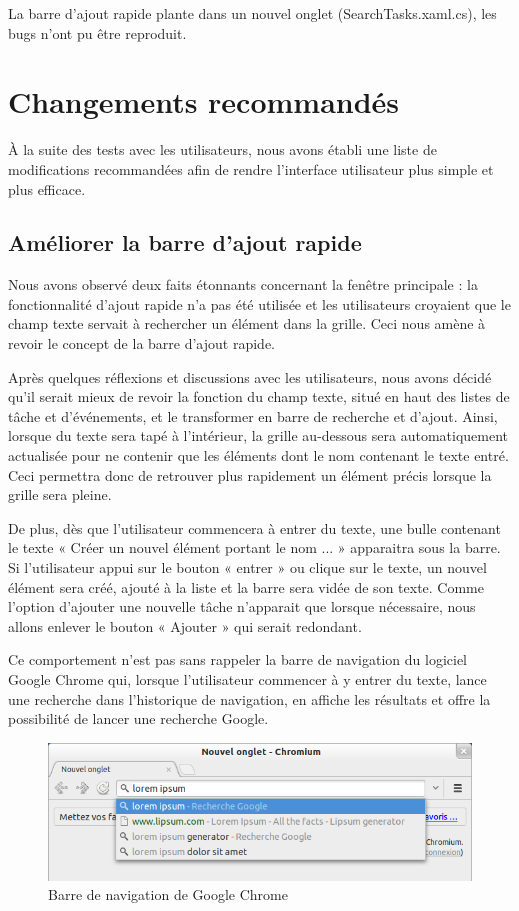 \documentclass[letterpaper, oneside, 12pt, these, creativecommons]{thETS}
\begin{document}
La barre d'ajout rapide plante dans un nouvel onglet (SearchTasks.xaml.cs), les bugs n'ont pu être reproduit.

\chapter{Changements recommandés}

À la suite des tests avec les utilisateurs, nous avons établi une liste de modifications recommandées afin de rendre l'interface utilisateur plus simple et plus efficace.

\section{Améliorer la barre d'ajout rapide}

Nous avons observé deux faits étonnants concernant la fenêtre principale : la fonctionnalité d'ajout rapide n'a pas été utilisée et les utilisateurs croyaient que le champ texte servait à rechercher un élément dans la grille. Ceci nous amène à revoir le concept de la barre d'ajout rapide.

Après quelques réflexions et discussions avec les utilisateurs, nous avons décidé qu'il serait mieux de revoir la fonction du champ texte, situé en haut des listes de tâche et d'événements, et le transformer en barre de recherche et d'ajout. Ainsi, lorsque du texte sera tapé à l'intérieur, la grille au-dessous sera automatiquement actualisée pour ne contenir que les éléments dont le nom contenant le texte entré. Ceci permettra donc de retrouver plus rapidement un élément précis lorsque la grille sera pleine.

De plus, dès que l'utilisateur commencera à entrer du texte, une bulle contenant le texte « Créer un nouvel élément portant le nom ... » apparaitra sous la barre. Si l'utilisateur appui sur le bouton « entrer » ou clique sur le texte, un nouvel élément sera créé, ajouté à la liste et la barre sera vidée de son texte. Comme l'option d'ajouter une nouvelle tâche n'apparait que lorsque nécessaire, nous allons enlever le bouton « Ajouter » qui serait redondant.

Ce comportement n'est pas sans rappeler la barre de navigation du logiciel Google Chrome qui, lorsque l'utilisateur commencer à y entrer du texte, lance une recherche dans l'historique de navigation, en affiche les résultats et offre la possibilité de lancer une recherche Google.

\begin{figure}
    \includegraphics[scale=0.5]{barre_de_navigation_google_chrome.png}
    \caption{Barre de navigation de Google Chrome}
\end{figure}
\end{document}
